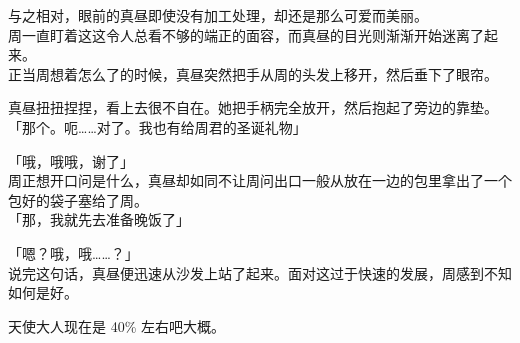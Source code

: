 与之相对，眼前的真昼即使没有加工处理，却还是那么可爱而美丽。\\

周一直盯着这这令人总看不够的端正的面容，而真昼的目光则渐渐开始迷离了起来。\\

正当周想着怎么了的时候，真昼突然把手从周的头发上移开，然后垂下了眼帘。

真昼扭扭捏捏，看上去很不自在。她把手柄完全放开，然后抱起了旁边的靠垫。\\

「那个。呃……对了。我也有给周君的圣诞礼物」

「哦，哦哦，谢了」\\

周正想开口问是什么，真昼却如同不让周问出口一般从放在一边的包里拿出了一个包好的袋子塞给了周。\\

「那，我就先去准备晚饭了」

「嗯？哦，哦……？」\\

说完这句话，真昼便迅速从沙发上站了起来。面对这过于快速的发展，周感到不知如何是好。

\atogakiline

天使大人现在是 40\% 左右吧大概。
